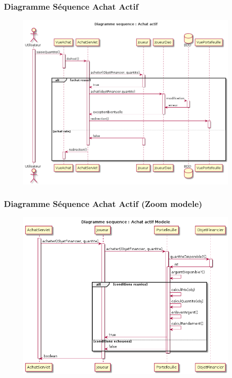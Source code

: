 \begin{frame}
    \frametitle{Diagramme Séquence Achat Actif}
    \begin{figure}
		\includegraphics[scale=0.23]{images/DiagrammeSequenceAchatActif.png}
	\end{figure}

\end{frame}

\begin{frame}
    \frametitle{Diagramme Séquence Achat Actif (Zoom modele)}
    \begin{figure}
		\includegraphics[scale=0.28]{images/DiagrammeSequenceAchatActifModele.png}
	\end{figure}

\end{frame}

